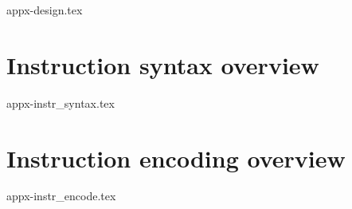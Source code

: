 \documentclass{scarv-report}
\begin{document}
{appx-design.tex}

\clearpage
\section{Instruction syntax   overview}
\label{appx:instr_syntax}

{appx-instr_syntax.tex}

\clearpage
\section{Instruction encoding overview} 
\label{appx:instr_encode}

{appx-instr_encode.tex}

\end{document}
